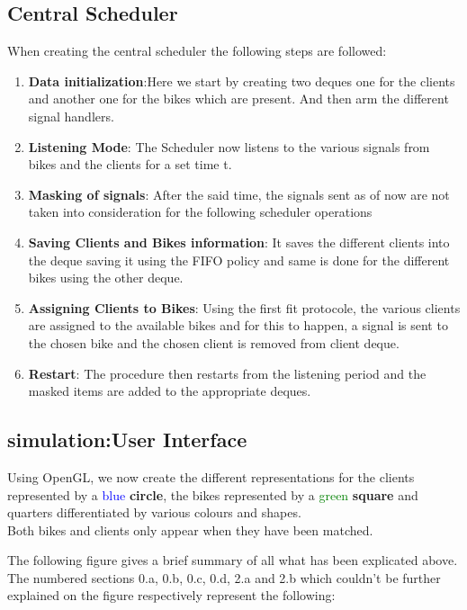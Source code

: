 \subsection{Central Scheduler}
When creating the central scheduler the following steps are followed:
\begin{enumerate}
  \item \textbf{Data initialization}:Here we start by creating two deques one for the clients and another one for the bikes which are present. And then arm the different signal handlers.
  \item \textbf{Listening Mode}: The Scheduler now listens to the various signals from bikes and the clients for a set time t.
  \item \textbf{Masking of signals}: After the said time, the signals sent as of now are not taken into consideration for the following scheduler operations
  \item \textbf{Saving Clients and Bikes information}: It saves the different clients into the deque saving it using the FIFO policy and same is done for the different bikes using the other deque.
  \item \textbf{Assigning Clients to Bikes}: Using the first fit protocole, the various clients are assigned to the available bikes and for this to happen, a signal is sent to the chosen bike and the chosen client is removed from client deque.
  \item \textbf{Restart}: The procedure then restarts from the listening period and the masked items are added to the appropriate deques.
\end{enumerate}


\newpage

\subsection{simulation:User Interface}
Using OpenGL, we now create the different representations for the clients represented by a \textcolor{blue}{blue} \textbf{circle}, the bikes represented by a \textcolor{green}{green} \textbf{square} and quarters differentiated by various colours and shapes.\\
Both bikes and clients only appear when they have been matched.


The following figure gives a brief summary of all what has been explicated above.
The numbered sections 0.a, 0.b, 0.c, 0.d, 2.a and 2.b which couldn't be further explained on the figure respectively represent the following:

